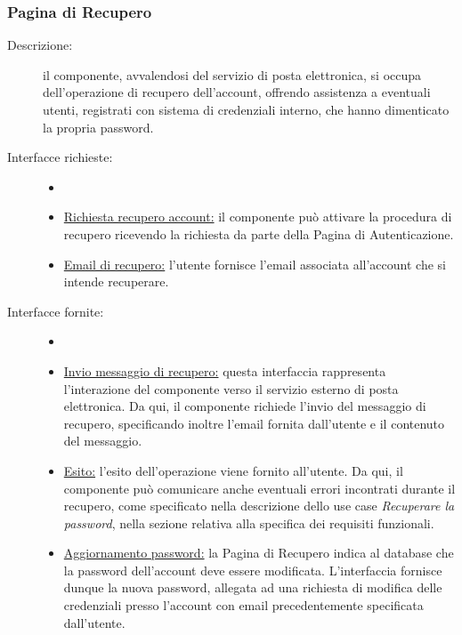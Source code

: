 \documentclass[11pt, a4paper]{article}
\theoremstyle{definition} %
\begin{document}
\subsubsection{Pagina di Recupero}
\begin{description}
    \item[Descrizione:] il componente, avvalendosi del servizio di posta
    elettronica, si occupa dell'operazione
    di recupero dell'account, offrendo assistenza a eventuali utenti,
    registrati con sistema di credenziali interno, che hanno dimenticato
    la propria password.

    \item[Interfacce richieste:]
    \begin{itemize}
        \item[]

        \item \underline{Richiesta recupero account:} il componente
        può attivare la procedura di recupero ricevendo la richiesta
        da parte della Pagina di Autenticazione.

        \item \underline{Email di recupero:} l'utente fornisce l'email
        associata all'account che si intende recuperare.

    \end{itemize}

    \item[Interfacce fornite:]
    \begin{itemize}
        \item[]

        \item \underline{Invio messaggio di recupero:} questa interfaccia
        rappresenta l'interazione del componente verso
        il servizio esterno di posta elettronica. Da qui, il
        componente richiede l'invio del messaggio di recupero,
        specificando inoltre l'email fornita dall'utente e il
        contenuto del messaggio.

        \item \underline{Esito:} l'esito dell'operazione viene
        fornito all'utente. Da qui, il componente può comunicare
        anche eventuali errori incontrati durante il recupero,
        come specificato nella descrizione dello use case
        \textit{Recuperare la password}, nella sezione relativa
        alla specifica dei requisiti funzionali.

        \item \underline{Aggiornamento password:} la Pagina di
        Recupero indica al database che la password dell'account
        deve essere modificata. L'interfaccia fornisce dunque
        la nuova password, allegata ad una richiesta di modifica
        delle credenziali presso l'account con email precedentemente
        specificata dall'utente.
    \end{itemize}
\end{description}
\end{document}
